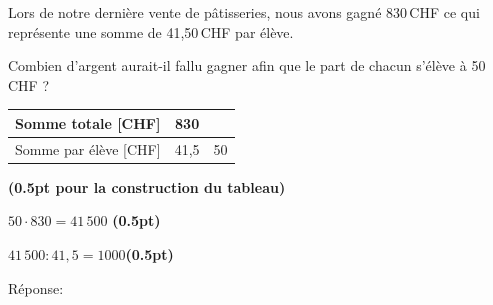 
\question[2]
Lors de notre dernière vente de pâtisseries, nous avons gagné 830\,CHF ce qui représente une somme de 41,50\,CHF par élève. 

\vspace{10pt}
Combien d'argent aurait-il fallu gagner afin que le part de chacun s'élève à 50\,CHF ?

\vspace{10pt}{\footnotesize\raggedleft Espace pour ta démarche et tes calculs\par}
\begin{solutionorgrid}[200pt]

\vspace{5pt}
\def\arraystretch{1.5}
\begin{tabularx}{0.5\textwidth}{l|C|C|}
Somme totale [CHF]&830&\\
\hline
Somme par élève [CHF]&41,5&50\\
\end{tabularx}
\def\arraystretch{1.5}

\hfill\textbf{(0.5pt pour la construction du tableau)}

\vspace{15pt}$50 \cdot 830 = 41\,500$ \hfill\textbf{(0.5pt)}

\vspace{5pt}$41\,500 : 41,5 = 1000$\hfill\textbf{(0.5pt)}

\end{solutionorgrid}

\begin{tcolorbox}[enhanced jigsaw, interior hidden, colframe=box, parbox=false]%
Réponse: 
\end{tcolorbox}

